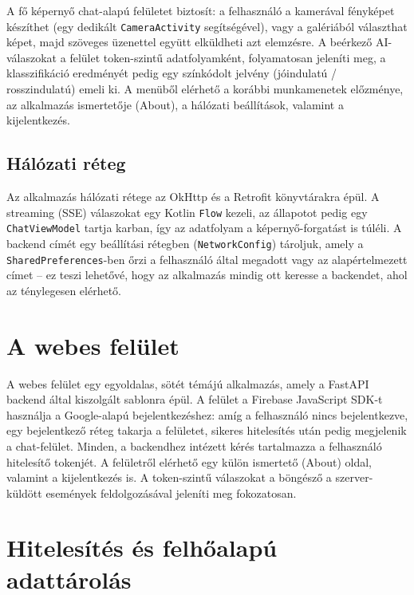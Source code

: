 A fő képernyő chat-alapú felületet biztosít: a felhasználó a kamerával
fényképet készíthet (egy dedikált \texttt{CameraActivity} segítségével), vagy a
galériából választhat képet, majd szöveges üzenettel együtt elküldheti azt
elemzésre. A beérkező AI-válaszokat a felület token-szintű adatfolyamként,
folyamatosan jeleníti meg, a klasszifikáció eredményét pedig egy színkódolt
jelvény (jó\-indulatú / rosszindulatú) emeli ki. A menüből elérhető a korábbi
munkamenetek előzménye, az alkalmazás ismertetője (About), a hálózati
beállítások, valamint a kijelentkezés.

\subsection{Hálózati réteg}

Az alkalmazás hálózati rétege az OkHttp és a Retrofit könyvtárakra épül. A
streaming (SSE) válaszokat egy Kotlin \texttt{Flow} kezeli, az állapotot pedig
egy \texttt{ChatViewModel} tartja karban, így az adatfolyam a képernyő-forgatást
is túléli. A backend címét egy beállítási rétegben (\texttt{NetworkConfig})
tároljuk, amely a \texttt{SharedPreferences}-ben őrzi a felhasználó által
megadott vagy az alapértelmezett címet -- ez teszi lehetővé, hogy az alkalmazás
mindig ott keresse a backendet, ahol az ténylegesen elérhető.

\section{A webes felület}

A webes felület egy egyoldalas, sötét témájú alkalmazás, amely a FastAPI backend
által kiszolgált sablonra épül. A felület a Firebase JavaScript SDK-t használja a
Google-alapú bejelentkezéshez: amíg a felhasználó nincs bejelentkezve, egy
bejelentkező réteg takarja a felületet, sikeres hitelesítés után pedig
megjelenik a chat-felület. Minden, a backendhez intézett kérés tartalmazza a
felhasználó hitelesítő tokenjét. A felületről elérhető egy külön
ismertető (About) oldal, valamint a kijelentkezés is. A token-szintű
válaszokat a böngésző a szerver-küldött események feldolgozásával jeleníti meg
fokozatosan.

\section{Hitelesítés és felhőalapú adattárolás}

